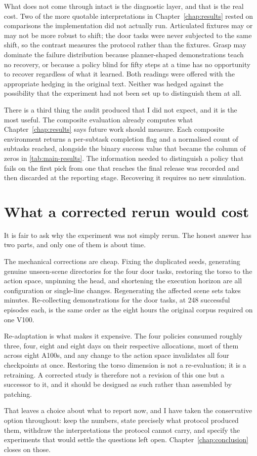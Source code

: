 What does not come through intact is the diagnostic layer, and that is the real cost. Two of the more quotable interpretations in Chapter~\ref{chap:results} rested on comparisons the implementation did not actually run. Articulated fixtures may or may not be more robust to shift; the door tasks were never subjected to the same shift, so the contrast measures the protocol rather than the fixtures. Grasp may dominate the failure distribution because planner-shaped demonstrations teach no recovery, or because a policy blind for fifty steps at a time has no opportunity to recover regardless of what it learned. Both readings were offered with the appropriate hedging in the original text. Neither was hedged against the possibility that the experiment had not been set up to distinguish them at all.

There is a third thing the audit produced that I did not expect, and it is the most useful. The composite evaluation already computes what Chapter~\ref{chap:results} says future work should measure. Each composite environment returns a per-subtask completion flag and a normalised count of subtasks reached, alongside the binary success value that became the column of zeros in \ref{tab:main-results}. The information needed to distinguish a policy that fails on the first pick from one that reaches the final release was recorded and then discarded at the reporting stage. Recovering it requires no new simulation.

\section{What a corrected rerun would cost}

It is fair to ask why the experiment was not simply rerun. The honest answer has two parts, and only one of them is about time.

The mechanical corrections are cheap. Fixing the duplicated seeds, generating genuine unseen-scene directories for the four door tasks, restoring the torso to the action space, unpinning the head, and shortening the execution horizon are all configuration or single-line changes. Regenerating the affected scene sets takes minutes. Re-collecting demonstrations for the door tasks, at 248 successful episodes each, is the same order as the eight hours the original corpus required on one V100.

Re-adaptation is what makes it expensive. The four policies consumed roughly three, four, eight and eight days on their respective allocations, most of them across eight A100s, and any change to the action space invalidates all four checkpoints at once. Restoring the torso dimension is not a re-evaluation; it is a retraining. A corrected study is therefore not a revision of this one but a successor to it, and it should be designed as such rather than assembled by patching.

That leaves a choice about what to report now, and I have taken the conservative option throughout: keep the numbers, state precisely what protocol produced them, withdraw the interpretations the protocol cannot carry, and specify the experiments that would settle the questions left open. Chapter~\ref{chap:conclusion} closes on those.

\endgroup
